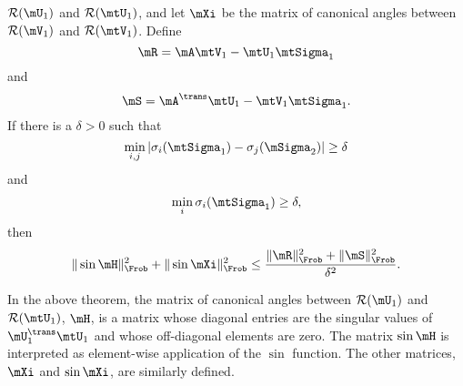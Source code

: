 \begin{theorem}[Wedin]
    $\mathcal{R}(\mU_1)$ and $\mathcal{R}(\mtU_1)$, and let
    $\mXi$ be the matrix of canonical angles between
    $\mathcal{R}(\mV_1)$ and $\mathcal{R}(\mtV_1)$.  Define
    \[
        \mR = \mA \mtV_1 - \mtU_1 \mtSigma_1
    \]
    and
    \[
        \mS = \mA^\trans \mtU_1 - \mtV_1 \mtSigma_1.
    \]
    If there is a $\delta > 0$ such that
    \[
        \min_{i,j} 
            | \sigma_i( \mtSigma_1 ) - \sigma_j( \mSigma_2 )| 
        \geq 
        \delta
    \]
    and
    \[
        \min_i \sigma_i( \mtSigma_1 ) \geq \delta,
    \]
    then
    \[
        \| \sin \mH \|_\Frob^2 + \| \sin \mXi \|_\Frob^2
        \leq
        \frac{\| \mR \|_\Frob^2 + \| \mS \|_\Frob^2}{\delta^2}.
    \]
\end{theorem}

\noindent
In the above theorem, the matrix of canonical angles between 
$\mathcal{R}(\mU_1)$ and $\mathcal{R}(\mtU_1)$, $\mH$, is a matrix whose
diagonal entries are the singular values of $\mU_1^\trans \mtU_1$ and whose
off-diagonal elements are zero.  The matrix $\sin \mH$ is interpreted as element-wise application of the $\sin$ function.  The other matrices, $\mXi$ and $\sin \mXi$, are similarly defined.